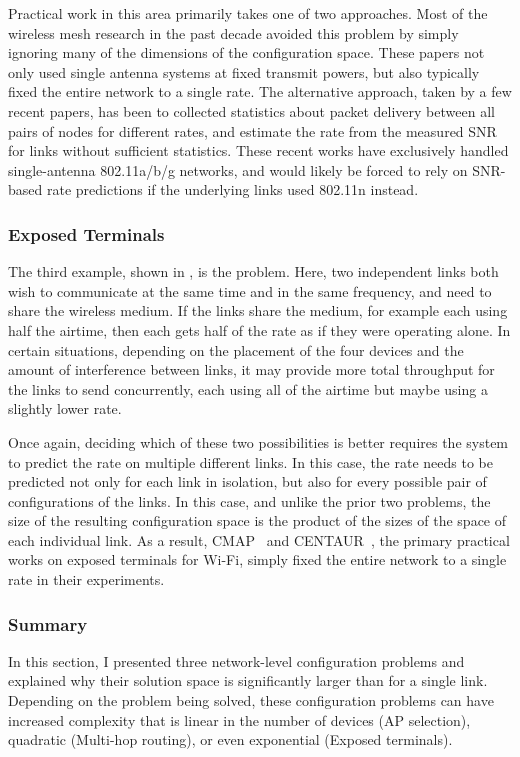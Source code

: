 Practical work in this area primarily takes one of two approaches. Most of the wireless mesh research in the past decade avoided this problem by simply ignoring many of the dimensions of the configuration space. These papers not only used single antenna systems at fixed transmit powers, but also typically fixed the entire network to a single rate. The alternative approach, taken by a few recent papers, has been to collected statistics about packet delivery between all pairs of nodes for different rates, and estimate the rate from the measured SNR for links without sufficient statistics. These recent works have exclusively handled single-antenna 802.11a/b/g networks, and would likely be forced to rely on SNR-based rate predictions if the underlying links used 802.11n instead.

\subsubsection{Exposed Terminals}
The third example, shown in , is the  problem. Here, two independent links both wish to communicate at the same time and in the same frequency, and need to share the wireless medium. If the links share the medium, for example each using half the airtime, then each gets half of the rate as if they were operating alone. In certain situations, depending on the placement of the four devices and the amount of interference between links, it may provide more total throughput for the links to send concurrently, each using all of the airtime but maybe using a slightly lower rate.

Once again, deciding which of these two possibilities is better requires the system to predict the rate on multiple different links. In this case, the rate needs to be predicted not only for each link in isolation, but also for every possible pair of configurations of the links. In this case, and unlike the prior two problems, the size of the resulting configuration space is the product of the sizes of the space of each individual link. As a result, CMAP~\cite{Vutukuru_CMAP} and CENTAUR~\cite{Shrivastava_CENTAUR}, the primary practical works on exposed terminals for Wi-Fi, simply fixed the entire network to a single rate in their experiments.

\subsubsection{Summary}
In this section, I presented three network-level configuration problems and explained why their solution space is significantly larger than for a single link. Depending on the problem being solved, these configuration problems can have increased complexity that is linear in the number of devices (AP selection), quadratic (Multi-hop routing), or even exponential (Exposed terminals).

